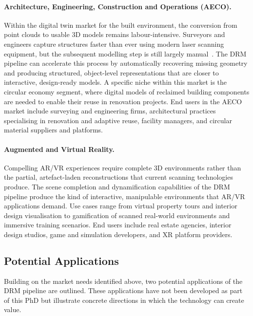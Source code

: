 \paragraph{Architecture, Engineering, Construction and Operations (AECO).} Within the digital twin market for the built environment, the conversion from point clouds to usable 3D models remains labour-intensive. Surveyors and engineers capture structures faster than ever using modern laser scanning equipment, but the subsequent modelling step is still largely manual~\cite{geyter_point_2022}. The DRM pipeline can accelerate this process by automatically recovering missing geometry and producing structured, object-level representations that are closer to interactive, design-ready models. A specific niche within this market is the circular economy segment, where digital models of reclaimed building components are needed to enable their reuse in renovation projects. End users in the AECO market include surveying and engineering firms, architectural practices specialising in renovation and adaptive reuse, facility managers, and circular material suppliers and platforms.

\paragraph{Augmented and Virtual Reality.} Compelling AR/VR experiences require complete 3D environments rather than the partial, artefact-laden reconstructions that current scanning technologies produce. The scene completion and dynamification capabilities of the DRM pipeline produce the kind of interactive, manipulable environments that AR/VR applications demand. Use cases range from virtual property tours and interior design visualisation to gamification of scanned real-world environments and immersive training scenarios. End users include real estate agencies, interior design studios, game and simulation developers, and XR platform providers.


\subsection{Potential Applications}
\label{sec:val_applications}

Building on the market needs identified above, two potential applications of the DRM pipeline are outlined. These applications have not been developed as part of this PhD but illustrate concrete directions in which the technology can create value.

